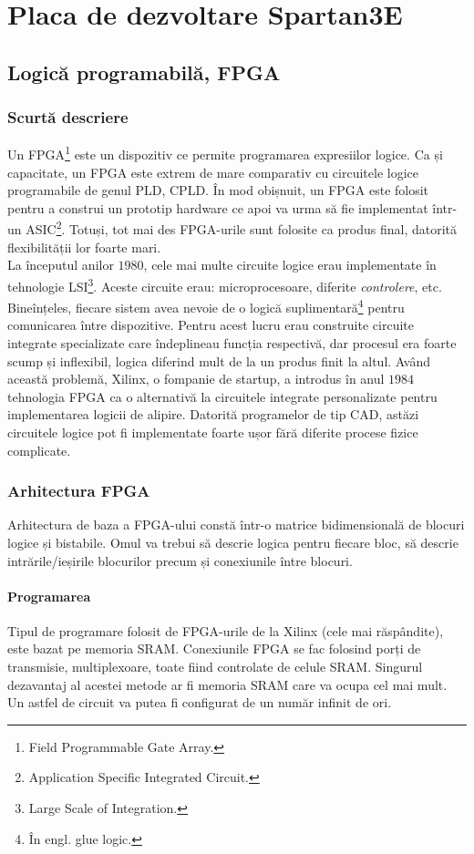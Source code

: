 \documentclass[12pt,twoside,a4paper,fleqn]{book}
\theoremstyle{definition}
\begin{document}
\chapter{Placa de dezvoltare Spartan3E}
\section{Logică programabilă, FPGA}
\label{capitol_fpga}
\subsection{Scurtă descriere}
Un FPGA\footnote{Field Programmable Gate Array.} este un dispozitiv ce permite programarea expresiilor logice. Ca și capacitate, un FPGA este extrem de mare comparativ cu circuitele logice programabile de genul PLD, CPLD. În mod obișnuit, un FPGA este folosit pentru a construi un prototip hardware ce apoi va urma să fie implementat într-un ASIC\footnote{Application Specific Integrated Circuit.}. Totuși, tot mai des FPGA-urile sunt folosite ca produs final, datorită flexibilității lor foarte mari.\\
La începutul anilor $1980$, cele mai multe circuite logice erau implementate în tehnologie LSI\footnote{Large Scale of Integration.}. Aceste circuite erau: microprocesoare, diferite \emph{controlere}, etc. Bineînțeles, fiecare sistem avea nevoie de o logică suplimentară\footnote{În engl. glue logic.} pentru comunicarea între dispozitive. Pentru acest lucru erau construite circuite integrate specializate care îndeplineau funcția respectivă, dar procesul era foarte scump și inflexibil, logica diferind mult de la un produs finit la altul. Având această problemă, Xilinx, o fompanie de startup, a introdus în anul $1984$ tehnologia FPGA ca o alternativă la circuitele integrate personalizate pentru implementarea logicii de alipire. Datorită programelor de tip CAD, astăzi circuitele logice pot fi implementate foarte ușor fără diferite procese fizice complicate. \cite{Synthesis_arithmetic_circuits}\\
\subsection{Arhitectura FPGA}
Arhitectura de baza a FPGA-ului constă într-o matrice bidimensională de blocuri logice și bistabile. Omul va trebui să descrie logica pentru fiecare bloc, să descrie intrările/ieșirile blocurilor precum și conexiunile între blocuri.
\subsubsection{Programarea}
Tipul de programare folosit de FPGA-urile de la Xilinx (cele mai răspândite), este bazat pe memoria SRAM. Conexiunile FPGA se fac folosind porți de transmisie, multiplexoare, toate fiind controlate de celule SRAM. Singurul dezavantaj al acestei metode ar fi memoria SRAM care va ocupa cel mai mult. Un astfel de circuit va putea fi configurat de un număr infinit de ori. \cite{Synthesis_arithmetic_circuits}
\end{document}
